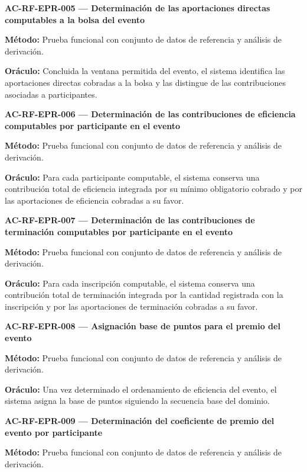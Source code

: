 \documentclass[10pt,letterpaper]{article}
\begin{document}
\noindent\textbf{AC-RF-EPR-005 --- Determinación de las aportaciones directas computables a la bolsa del evento}\par
\textbf{Método:} Prueba funcional con conjunto de datos de referencia y análisis de derivación.\par
\textbf{Oráculo:} Concluida la ventana permitida del evento, el sistema identifica las aportaciones directas cobradas a la bolsa y las distingue de las contribuciones asociadas a participantes.\par\vspace{0.45em}
\noindent\textbf{AC-RF-EPR-006 --- Determinación de las contribuciones de eficiencia computables por participante en el evento}\par
\textbf{Método:} Prueba funcional con conjunto de datos de referencia y análisis de derivación.\par
\textbf{Oráculo:} Para cada participante computable, el sistema conserva una contribución total de eficiencia integrada por su mínimo obligatorio cobrado y por las aportaciones de eficiencia cobradas a su favor.\par\vspace{0.45em}
\noindent\textbf{AC-RF-EPR-007 --- Determinación de las contribuciones de terminación computables por participante en el evento}\par
\textbf{Método:} Prueba funcional con conjunto de datos de referencia y análisis de derivación.\par
\textbf{Oráculo:} Para cada inscripción computable, el sistema conserva una contribución total de terminación integrada por la cantidad registrada con la inscripción y por las aportaciones de terminación cobradas a su favor.\par\vspace{0.45em}
\noindent\textbf{AC-RF-EPR-008 --- Asignación base de puntos para el premio del evento}\par
\textbf{Método:} Prueba funcional con conjunto de datos de referencia y análisis de derivación.\par
\textbf{Oráculo:} Una vez determinado el ordenamiento de eficiencia del evento, el sistema asigna la base de puntos siguiendo la secuencia base del dominio.\par\vspace{0.45em}
\noindent\textbf{AC-RF-EPR-009 --- Determinación del coeficiente de premio del evento por participante}\par
\textbf{Método:} Prueba funcional con conjunto de datos de referencia y análisis de derivación.\par
\end{document}
